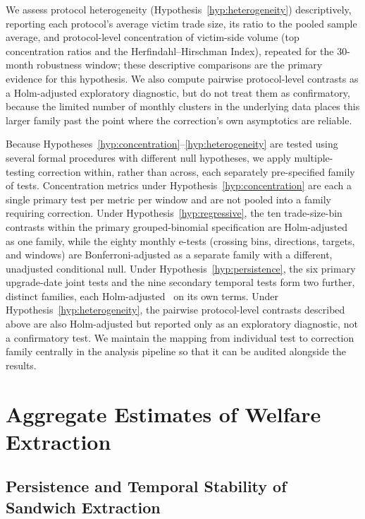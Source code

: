 \documentclass[pdflatex, sn-basic]{sn-jnl}
\theoremstyle{thmstylethree}%
\begin{document}
    We assess protocol heterogeneity (Hypothesis~\ref{hyp:heterogeneity}) descriptively, reporting each protocol's average victim trade size, its ratio to the pooled sample average, and protocol-level concentration of victim-side volume (top concentration ratios and the Herfindahl--Hirschman Index), repeated for the 30-month robustness window; these descriptive comparisons are the primary evidence for this hypothesis.
    We also compute pairwise protocol-level contrasts as a Holm-adjusted exploratory diagnostic, but do not treat them as confirmatory, because the limited number of monthly clusters in the underlying data places this larger family past the point where the correction's own asymptotics are reliable.
    
    Because Hypotheses~\ref{hyp:concentration}--\ref{hyp:heterogeneity} are tested using several formal procedures with different null hypotheses, we apply multiple-testing correction within, rather than across, each separately pre-specified family of tests.
    Concentration metrics under Hypothesis~\ref{hyp:concentration} are each a single primary test per metric per window and are not pooled into a family requiring correction.
    Under Hypothesis~\ref{hyp:regressive}, the ten trade-size-bin contrasts within the primary grouped-binomial specification are Holm-adjusted~\citep{Holm1979} as one family, while the eighty monthly e-tests (crossing bins, directions, targets, and windows) are Bonferroni-adjusted as a separate family with a different, unadjusted conditional null.
    Under Hypothesis~\ref{hyp:persistence}, the six primary upgrade-date joint tests and the nine secondary temporal tests form two further, distinct families, each Holm-adjusted~\citep{Holm1979} on its own terms.
    Under Hypothesis~\ref{hyp:heterogeneity}, the pairwise protocol-level contrasts described above are also Holm-adjusted but reported only as an exploratory diagnostic, not a confirmatory test.
    We maintain the mapping from individual test to correction family centrally in the analysis pipeline so that it can be audited alongside the results.
    
    \FloatBarrier


	\section{Aggregate Estimates of Welfare Extraction}
	\label{sec:aggregate-welfare}
    \subsection{Persistence and Temporal Stability of Sandwich Extraction}
    \label{subsec:persistence}
\end{document}
